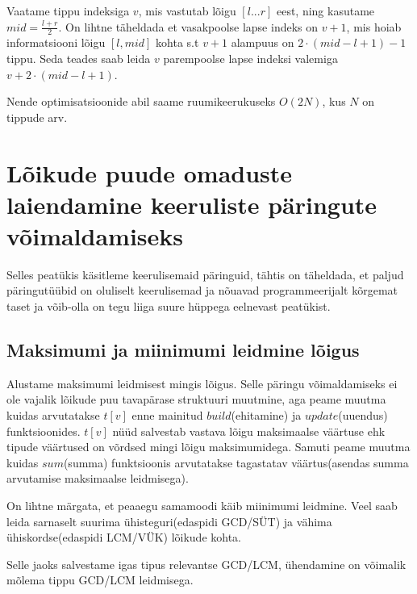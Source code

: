 \documentclass{trkut}
\theoremstyle{definition}
\begin{document}
Vaatame tippu indeksiga $v$, mis vastutab lõigu $[l...r]$ eest, ning kasutame $mid =  \frac{l+r}{2}$. On lihtne täheldada et vasakpoolse lapse indeks on $v+1$, mis hoiab informatsiooni lõigu $[l, mid]$ kohta s.t $v+1$ alampuus on $2\cdot(mid-l+1)-1$ tippu. Seda teades saab leida $v$ parempoolse lapse indeksi valemiga $v+2\cdot(mid-l+1)$. \parencite{EMaxx}

Nende optimisatsioonide abil saame ruumikeerukuseks $O(2N)$, kus $N$ on tippude arv. \parencite{EMaxx}



\section{Lõikude puude omaduste laiendamine keeruliste päringute võimaldamiseks}

Selles peatükis käsitleme keerulisemaid päringuid, tähtis on täheldada, et paljud päringutüübid on oluliselt keerulisemad ja nõuavad programmeerijalt kõrgemat taset ja võib-olla on tegu liiga suure hüppega eelnevast peatükist.

\subsection{Maksimumi ja miinimumi leidmine lõigus}

Alustame maksimumi leidmisest mingis lõigus. Selle päringu võimaldamiseks ei ole vajalik lõikude puu tavapärase struktuuri muutmine, aga peame muutma kuidas arvutatakse $t[v]$ enne mainitud $build$(ehitamine) ja $update$(uuendus) funktsioonides. $t[v]$ nüüd salvestab vastava lõigu maksimaalse väärtuse ehk tipude väärtused on võrdsed mingi lõigu maksimumidega. Samuti peame muutma kuidas $sum$(summa) funktsioonis arvutatakse tagastatav väärtus(asendas summa arvutamise maksimaalse leidmisega). \parencite{EMaxx}

On lihtne märgata, et peaaegu samamoodi käib miinimumi leidmine. Veel saab leida sarnaselt suurima ühisteguri(edaspidi GCD/SÜT) ja vähima ühiskordse(edaspidi LCM/VÜK) lõikude kohta. 

Selle jaoks salvestame igas tipus relevantse GCD/LCM, ühendamine on võimalik mõlema tippu GCD/LCM leidmisega. \parencite{EMaxx}
\end{document}
